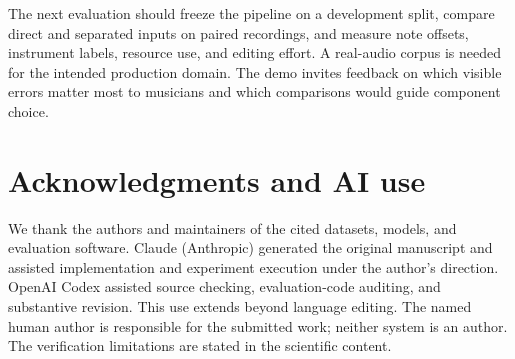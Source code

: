 \documentclass{article}
\begin{document}
The next evaluation should freeze the pipeline on a development split, compare
direct and separated inputs on paired recordings, and measure note offsets,
instrument labels, resource use, and editing effort. A real-audio corpus is needed
for the intended production domain. The demo invites feedback on which visible
errors matter most to musicians and which comparisons would guide component choice.

\section{Acknowledgments and AI use}
We thank the authors and maintainers of the cited datasets, models, and evaluation
software. Claude (Anthropic) generated the original manuscript and assisted
implementation and experiment execution under the author's direction. OpenAI Codex
assisted source checking, evaluation-code auditing, and substantive revision.
This use extends beyond language editing. The named human author is responsible
for the submitted work; neither system is an author. The verification limitations
are stated in the scientific content.

\end{document}
